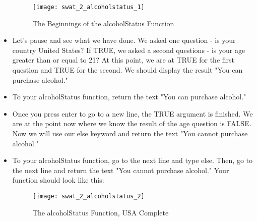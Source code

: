 \documentclass{article}
\begin{document}
\begin{itemize}
    	\begin{figure}[H]
  		\centering
  		\texttt{[image: swat\_2\_alcoholstatus\_1]}
  		\caption{The Beginnings of the alcoholStatus Function}
	\end{figure}
	\item Let's pause and see what we have done.  We asked one question - is your country United States?  If TRUE, we asked a second questions - is your age greater than or equal to 21?  At this point, we are at TRUE for the first question and TRUE for the second.  We should display the result "You can purchase alcohol."
	\item To your alcoholStatus function, return the text "You can purchase alcohol."
	\item Once you press enter to go to a new line, the TRUE argument is finished.  We are at the point now where we know the result of the age question is FALSE.  Now we will use our else keyword and return the text "You cannot purchase alcohol."
	\item To your alcoholStatus function, go to the next line and type else.  Then, go to the next line and return the text "You cannot purchase alcohol."  Your function should look like this:
		\begin{figure}[H]
  		\centering
  		\texttt{[image: swat\_2\_alcoholstatus\_2]}
  		\caption{The alcoholStatus Function, USA Complete}
	\end{figure}
\end{itemize}
\end{document}
